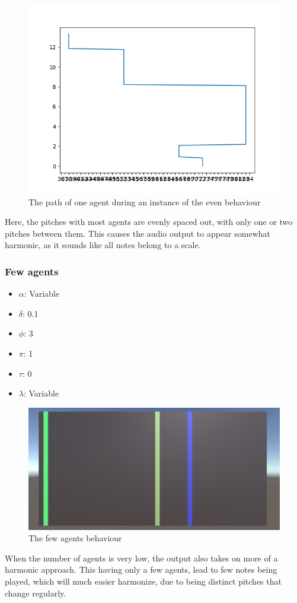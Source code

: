 \documentclass[a4paper,english]{report}
\begin{document}
	\begin{figure}
		\centering
		\includegraphics[width=1\linewidth]{evenOneAgent}
		\caption{The path of one agent during an instance of the even behaviour}
		\label{fig:evenOne}
	\end{figure}
	Here, the pitches with most agents are evenly spaced out, with only one or two pitches between them. This causes the audio output to appear somewhat harmonic, as it sounds like all notes belong to a scale.
	
	
	\subsubsection{Few agents}
	\begin{samepage}\begin{itemize}
		\item $\alpha$: Variable
		\item $\delta$: 0.1
		\item $\phi$: 3
		\item $\pi$: 1
		\item $\tau$: 0
		\item $\lambda$: Variable
	\end{itemize}\end{samepage}
	\begin{figure}
		\centering
		\includegraphics[width=1\linewidth]{few_agents}
		\caption{The few agents behaviour}
		\label{fig:few}
	\end{figure}
	When the number of agents is very low, the output also takes on more of a harmonic approach. This having only a few agents, lead to few notes being played, which will much easier harmonize, due to being distinct pitches that change regularly.
	
\end{document}
